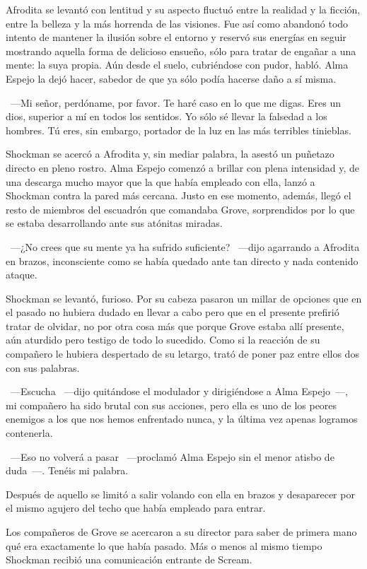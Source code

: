 Afrodita se levantó con lentitud y su aspecto fluctuó entre la realidad y la ficción, entre la belleza y la más horrenda de las visiones. Fue así como abandonó todo intento de mantener la ilusión sobre el entorno y reservó sus energías en seguir mostrando aquella forma de delicioso ensueño, sólo para tratar de engañar a una mente: la suya propia. Aún desde el suelo, cubriéndose con pudor, habló. Alma Espejo la dejó hacer, sabedor de que ya sólo podía hacerse daño a sí misma.

~---Mi señor, perdóname, por favor. Te haré caso en lo que me digas. Eres un dios, superior a mí en todos los sentidos. Yo sólo sé llevar la falsedad a los hombres. Tú eres, sin embargo, portador de la luz en las más terribles tinieblas.

Shockman se acercó a Afrodita y, sin mediar palabra, la asestó un puñetazo directo en pleno rostro. Alma Espejo comenzó a brillar con plena intensidad y, de una descarga mucho mayor que la que había empleado con ella, lanzó a Shockman contra la pared más cercana. Justo en ese momento, además, llegó el resto de miembros del escuadrón que comandaba Grove, sorprendidos por lo que se estaba desarrollando ante sus atónitas miradas.

~---¿No crees que su mente ya ha sufrido suficiente? ~---dijo agarrando a Afrodita en brazos, inconsciente como se había quedado ante tan directo y nada contenido ataque.

Shockman se levantó, furioso. Por su cabeza pasaron un millar de opciones que en el pasado no hubiera dudado en llevar a cabo pero que en el presente prefirió tratar de olvidar, no por otra cosa más que porque Grove estaba allí presente, aún aturdido pero testigo de todo lo sucedido. Como si la reacción de su compañero le hubiera despertado de su letargo, trató de poner paz entre ellos dos con sus palabras.

~---Escucha ~---dijo quitándose el modulador y dirigiéndose a Alma Espejo~---, mi compañero ha sido brutal con sus acciones, pero ella es uno de los peores enemigos a los que nos hemos enfrentado nunca, y la última vez apenas logramos contenerla.

~---Eso no volverá a pasar ~---proclamó Alma Espejo sin el menor atisbo de duda~---. Tenéis mi palabra.

Después de aquello se limitó a salir volando con ella en brazos y desaparecer por el mismo agujero del techo que había empleado para entrar.

Los compañeros de Grove se acercaron a su director para saber de primera mano qué era exactamente lo que había pasado. Más o menos al mismo tiempo Shockman recibió una comunicación entrante de Scream.

